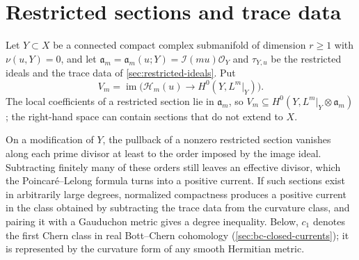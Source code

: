 \section{Restricted sections and trace data}

Let $Y\subset X$ be a connected compact complex submanifold of dimension $r\geq1$ with $\nu(u,Y)=0$, and let $\mathfrak a_m=\mathfrak a_m(u;Y)=\mathcal I(mu)\mathcal O_Y$ and $\tau_{Y,u}$ be the restricted ideals and the trace data of \cref{sec:restricted-ideals}. Put
\[
 V_m=\operatorname{im}\bigl(\mathcal H_m(u)\longrightarrow H^0(Y,L^m|_Y)\bigr).
\]
The local coefficients of a restricted section lie in $\mathfrak a_m$, so $V_m\subseteq H^0(Y,L^m|_Y\otimes\mathfrak a_m)$; the right-hand space can contain sections that do not extend to $X$.

On a modification of $Y$, the pullback of a nonzero restricted section vanishes along each prime divisor at least to the order imposed by the image ideal. Subtracting finitely many of these orders still leaves an effective divisor, which the Poincar\'e--Lelong formula turns into a positive current. If such sections exist in arbitrarily large degrees, normalized compactness produces a positive current in the class obtained by subtracting the trace data from the curvature class, and pairing it with a Gauduchon metric gives a degree inequality. Below, $c_1$ denotes the first Chern class in real Bott--Chern cohomology (\cref{sec:bc-closed-currents}); it is represented by the curvature form of any smooth Hermitian metric.

